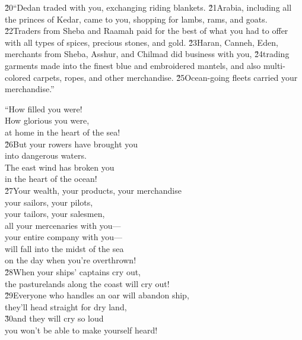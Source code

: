 \v{20}``Dedan traded with you, exchanging riding blankets. \v{21}Arabia, including all the princes of Kedar, came to you, shopping for lambs, rams, and goats. \v{22}Traders from Sheba and Raamah paid for the best of what you had to offer with all types of spices, precious stones, and gold. \v{23}Haran, Canneh, Eden, merchants from Sheba, Asshur, and Chilmad did business with you, \v{24}trading garments made into the finest blue and embroidered mantels, and also multi-colored carpets, ropes, and other merchandise. \v{25}Ocean-going fleets carried your merchandise.''

\begin{poetry}
\poeml ``How filled you were! \\
\poemll    How glorious you were, \\
\poemlll       at home in the heart of the sea! \\
\poeml \v{26}But your rowers have brought you \\
\poemll    into dangerous waters. \\
\poeml The east wind has broken you \\
\poemll    in the heart of the ocean! \\
\poeml \v{27}Your wealth, your products, your merchandise \\
\poemll    your sailors, your pilots, \\
\poeml your tailors, your salesmen, \\
\poemll    all your mercenaries with you--- \\
\poeml your entire company with you--- \\
\poemll    will fall into the midst of the sea \\
\poemlll       on the day when you're overthrown! \\
\poeml \v{28}When your ships' captains cry out, \\
\poemll    the pasturelands along the coast will cry out! \\
\poeml \v{29}Everyone who handles an oar will abandon ship, \\
\poemll    they'll head straight for dry land, \\
\poeml \v{30}and they will cry so loud \\
\poemll    you won't be able to make yourself heard! \\

\end{poetry}
